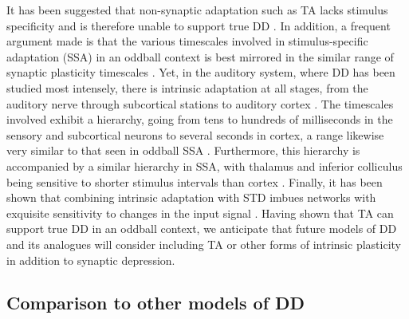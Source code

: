 \documentclass[9pt,lineno,onehalfspacing]{elife}
\begin{document}
It has been suggested that non-synaptic adaptation such as TA lacks stimulus specificity and is therefore unable to support true DD \citep{Duque2015-eu, Yarden2017-eh}. In addition, a frequent argument made is that the various timescales involved in stimulus-specific adaptation (SSA) in an oddball context \citep{Ulanovsky2004-nf} is best mirrored in the similar range of synaptic plasticity timescales \citep{Tsodyks1997-qt, Varela1997-nr}. Yet, in the auditory system, where DD has been studied most intensely, there is intrinsic adaptation at all stages, from the auditory nerve \citep{Yates1983-uu, Westerman1984-ge} through subcortical stations \citep{Ingham2004-wc} to auditory cortex \citep{Abolafia2011-ig}. The timescales involved exhibit a hierarchy, going from tens to hundreds of milliseconds in the sensory and subcortical neurons to several seconds in cortex, a range likewise very similar to that seen in oddball SSA \citep{Ulanovsky2004-nf}. Furthermore, this hierarchy is accompanied by a similar hierarchy in SSA, with thalamus and inferior colliculus being sensitive to shorter stimulus intervals than cortex \citep{Perez-Gonzalez2014-pm}. Finally, it has been shown that combining intrinsic adaptation with STD imbues networks with exquisite sensitivity to changes in the input signal \citep{Puccini2006-tm}. Having shown that TA can support true DD in an oddball context, we anticipate that future models of DD and its analogues will consider including TA or other forms of intrinsic plasticity in addition to synaptic depression.

\subsection{Comparison to other models of DD}
\end{document}
